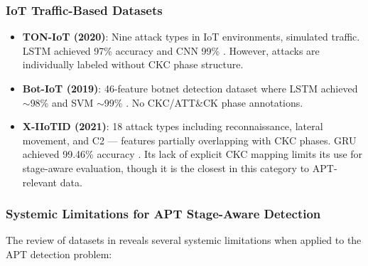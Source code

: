 \subsubsection{IoT Traffic-Based Datasets}

\begin{itemize}
    \item \textbf{TON-IoT (2020)}: Nine attack types in IoT environments, simulated traffic. LSTM achieved 97\% accuracy and CNN 99\% \cite{ankalaki2025cyber}. However, attacks are individually labeled without CKC phase structure.
    \item \textbf{Bot-IoT (2019)}: 46-feature botnet detection dataset where LSTM achieved $\sim$98\% and SVM $\sim$99\% \cite{ankalaki2025cyber}. No CKC/ATT\&CK phase annotations.
    \item \textbf{X-IIoTID (2021)}: 18 attack types including reconnaissance, lateral movement, and C2 --- features partially overlapping with CKC phases. GRU achieved 99.46\% accuracy \cite{ankalaki2025cyber}. Its lack of explicit CKC mapping limits its use for stage-aware evaluation, though it is the closest in this category to APT-relevant data.
\end{itemize}


\subsubsection{Systemic Limitations for APT Stage-Aware Detection}

The review of datasets in \cite{ankalaki2025cyber} reveals several systemic limitations when applied to the APT detection problem:

